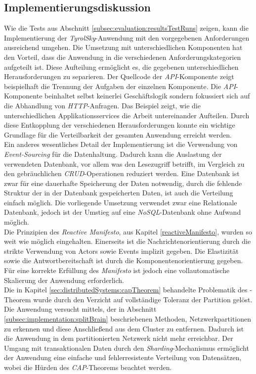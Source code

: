 \subsection{Implementierungsdiskussion}
Wie die Tests aus Abschnitt \ref{subsec:evaluation:resultsTestRuns} zeigen, kann die Implementierung der \textit{TyrolSky}-Anwendung mit den vorgegebenen Anforderungen ausreichend umgehen. Die Umsetzung mit unterschiedlichen Komponenten hat den Vorteil, dass die Anwendung in die verschiedenen Anforderungskategorien aufgeteilt ist. Diese Aufteilung ermöglicht es, die gegebenen unterschiedlichen Herausforderungen zu separieren. Der Quellcode der \textit{API}-Komponente zeigt beispielhaft die Trennung der Aufgaben der einzelnen Komponente. Die \textit{API}-Komponente beinhaltet selbst keinerlei Geschäftslogik sondern fokussiert sich auf die Abhandlung von \textit{HTTP}-Anfragen. Das Beispiel zeigt, wie die unterschiedlichen Applikationsservices die Arbeit untereinander Aufteilen. Durch diese Entkopplung der verschiedenen Herausforderungen konnte ein wichtige Grundlage für die Verteilbarkeit der gesamten Anwendung erreicht werden. \\
Ein anderes wesentliches Detail der Implementierung ist die Verwendung von \textit{Event-Sourcing} für die Datenhaltung. Dadurch kann die Auslastung der verwendeten Datenbank, vor allem was den Lesezugriff betrifft, im Vergleich zu den gebräuchlichen \textit{CRUD}-Operationen reduziert werden. 
Eine Datenbank ist zwar für eine dauerhafte Speicherung der Daten notwendig, durch die fehlende Struktur der in der Datenbank gespeicherten Daten, ist auch die Verteilung einfach möglich. Die vorliegende Umsetzung verwendet zwar eine Relationale Datenbank, jedoch ist der Umstieg auf eine \textit{NoSQL}-Datenbank ohne Aufwand möglich. \\
Die Prinzipien des \textit{Reactive Manifesto}, aus Kapitel \ref{reactiveManifesto}, wurden so weit wie möglich eingehalten. Einerseits ist die Nachrichtenorientierung durch die strikte Verwendung von Actors sowie Events implizit gegeben. Die Elastizität sowie die Antwortbereitschaft ist durch die Komponentenorientierung gegeben. Für eine korrekte Erfüllung des \textit{Manifesto} ist jedoch eine vollautomatische Skalierung der Anwendung erforderlich. \\
Die in Kapitel \ref{sec:distributedSystems:capTheorem} behandelte Problematik des -Theorem wurde durch den Verzicht auf vollständige Toleranz der Partition gelöst. Die Anwendung versucht mittels, der in Abschnitt 
\ref{subsec:implementation:splitBrain} beschriebenen Methoden, Netzwerkpartitionen zu erkennen und diese Anschließend aus dem Cluster zu entfernen. Dadurch ist die Anwendung in dem partitionierten Netzwerk nicht mehr erreichbar. Der Umgang mit transaktionalen Daten durch den \textit{Sharding}-Mechanismus ermöglicht der Anwendung eine einfache und fehlerresistente Verteilung von Datensätzen, wobei die Hürden des \textit{CAP}-Theorems beachtet werden.


